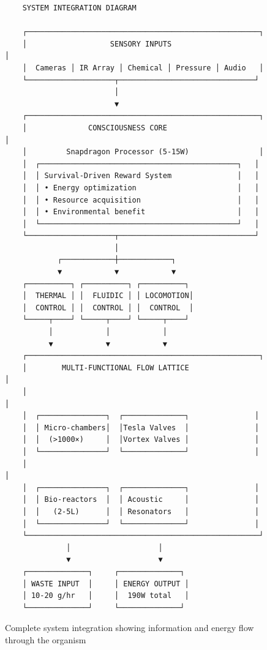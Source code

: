 \begin{figure}[H]
    \centering
    \begin{verbatim}
    SYSTEM INTEGRATION DIAGRAM
    
    ┌─────────────────────────────────────────────────────┐
    │                   SENSORY INPUTS                     │
    │  Cameras │ IR Array │ Chemical │ Pressure │ Audio   │
    └────────────────────┬───────────────────────────────┘
                         │
                         ▼
    ┌─────────────────────────────────────────────────────┐
    │              CONSCIOUSNESS CORE                      │
    │         Snapdragon Processor (5-15W)                │
    │  ┌─────────────────────────────────────────────┐   │
    │  │ Survival-Driven Reward System               │   │
    │  │ • Energy optimization                       │   │
    │  │ • Resource acquisition                      │   │
    │  │ • Environmental benefit                     │   │
    │  └─────────────────────────────────────────────┘   │
    └────────────────────┬───────────────────────────────┘
                         │
            ┌────────────┼────────────┐
            ▼            ▼            ▼
    ┌──────────┐ ┌──────────┐ ┌──────────┐
    │  THERMAL │ │  FLUIDIC │ │ LOCOMOTION│
    │  CONTROL │ │  CONTROL │ │  CONTROL  │
    └─────┬────┘ └─────┬────┘ └─────┬────┘
          │            │            │
          ▼            ▼            ▼
    ┌─────────────────────────────────────────────────────┐
    │        MULTI-FUNCTIONAL FLOW LATTICE                 │
    │                                                       │
    │  ┌───────────────┐  ┌──────────────┐               │
    │  │ Micro-chambers│  │Tesla Valves  │               │
    │  │  (>1000×)     │  │Vortex Valves │               │
    │  └───────────────┘  └──────────────┘               │
    │                                                       │
    │  ┌───────────────┐  ┌──────────────┐               │
    │  │ Bio-reactors  │  │ Acoustic     │               │
    │  │   (2-5L)      │  │ Resonators   │               │
    │  └───────────────┘  └──────────────┘               │
    └─────────────────────────────────────────────────────┘
              │                    │
              ▼                    ▼
    ┌──────────────┐     ┌──────────────┐
    │ WASTE INPUT  │     │ ENERGY OUTPUT │
    │ 10-20 g/hr   │     │  190W total   │
    └──────────────┘     └──────────────┘
    \end{verbatim}
    \caption{Complete system integration showing information and energy flow through the organism}
    \label{fig:system_integration}
\end{figure}

